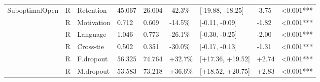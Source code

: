 \begin{longtable}[t]{lllllllll}
\midrule
SuboptimalOpen & R & Retention & 45.067 & 26.004 & -42.3\% & [-19.88, -18.25] & -3.75 & <0.001***\\
  & R & Motivation & 0.712 & 0.609 & -14.5\% & [-0.11, -0.09] & -1.82 & <0.001***\\
  & R & Language & 1.046 & 0.773 & -26.1\% & [-0.30, -0.25] & -2.00 & <0.001***\\
  & R & Cross-tie & 0.502 & 0.351 & -30.0\% & [-0.17, -0.13] & -1.31 & <0.001***\\
  & R & F.dropout & 56.325 & 74.764 & +32.7\% & [+17.36, +19.52] & +2.74 & <0.001***\\
  & R & M.dropout & 53.583 & 73.218 & +36.6\% & [+18.52, +20.75] & +2.83 & <0.001***\\
\end{longtable}
\endgroup

